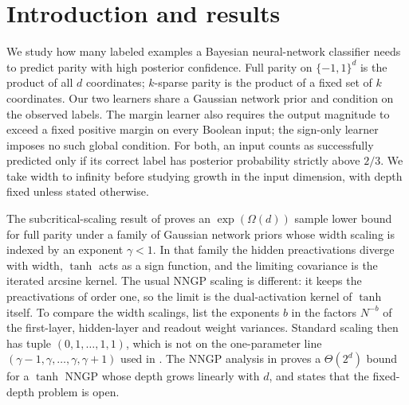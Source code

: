 \documentclass[11pt]{article}
\theoremstyle{definition}\newtheorem{assumption}[theorem]{Assumption}
\theoremstyle{remark}\newtheorem{remark}[theorem]{Remark}
\begin{document}
\begin{abstract}
and
$\exp(d^{\epsilon})\le n\le e^{cd}$, with probability at least $7/8$ the
cost per sample is superpolynomial in $d$. A sharper lower bound, of order
$a^2$ over the prior tail variance per sample when $\log n\asymp d$ and
valid with probability at least $3/4$, shows that no upper bound on that
cost can match the first one, and that with our tail-Gram bound the
bound on the low-degree component used for those priors, applied at the
margin scale,
cannot give an exponential bound whatever upper bound on the cost holds.
Both bounds use the same Lean coercivity theorem. Versions for every
$\delta\in(0,1/8)$, with probabilities $1-2\delta$ and $1-4\delta$, are
proved conditionally on an external chaining estimate stated in the paper.
Numerical spectra and small-dimensional
posterior computations illustrate the results.
\end{abstract}

\section{Introduction and results}
We study how many labeled examples a Bayesian neural-network classifier
needs to predict parity with high posterior confidence. Full parity on
$\{-1,1\}^d$ is the product of all $d$ coordinates; $k$-sparse parity
is the product of a fixed set of $k$ coordinates. Our two learners share
a Gaussian network prior and condition on the observed labels. The
margin learner also requires the output magnitude to exceed a fixed
positive margin on every Boolean input; the sign-only learner imposes
no such global condition. For both, an input counts as successfully
predicted only if its correct label has posterior probability strictly
above $2/3$. We take width to infinity before studying growth in the
input dimension, with depth fixed unless stated otherwise.

The subcritical-scaling result of \cite{subcritical} proves an
$\exp(\Omega(d))$ sample lower bound for full parity under a family of
Gaussian network priors whose width scaling is indexed by an exponent
$\gamma<1$. In that family the hidden preactivations diverge with width,
$\tanh$ acts as a sign function, and the limiting covariance is the
iterated arcsine kernel. The usual NNGP scaling
\cite{neal,leeetal,matthews} is different: it keeps the preactivations of
order one, so the limit is the dual-activation kernel \cite{daniely} of
$\tanh$ itself. To compare the width scalings, list the exponents $b$
in the factors $N^{-b}$ of the first-layer, hidden-layer and readout
weight variances. Standard scaling then has tuple
$(0,1,\ldots,1,1)$, which is not on the one-parameter line
$(\gamma-1,\gamma,\ldots,\gamma,\gamma+1)$ used in \cite{subcritical}.
The NNGP analysis in \cite{nngpnote} proves a $\Theta(2^d)$ bound
for a $\tanh$ NNGP whose depth grows linearly with $d$, and states that the
fixed-depth problem is open.
\end{document}
